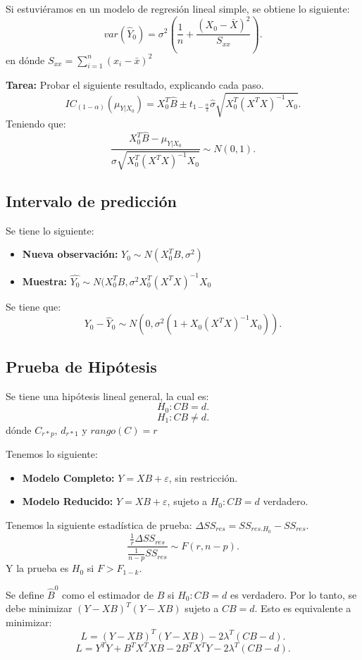 \documentclass{article}
\begin{document}
Si estuviéramos en un modelo de regresión lineal simple, se obtiene lo siguiente:
\[ var(\hat{Y}_{0})=\sigma^{2}(\frac{1}{n}+ \frac{(X_{0}-\bar{X})^{2}}{S_{xx}}) .\]
en dónde $S_{xx}=\sum_{i=1}^{n}(x_{i}-\bar{x})^{2}$

\textbf{Tarea: }Probar el siguiente resultado, explicando cada paso.
\[ IC_{(1-\alpha)}(\mu_{Y|X_{0}})=X_{0}^{T}\hat{B} \pm t_{1-\frac{\alpha}{2}}\hat{\sigma}\sqrt{X_{0}^{T}(X^{T}X)^{-1}X_{0}} .\]
Teniendo que:
\[ \frac{X_{0}^{T}\hat{B}-\mu_{Y|X_{0}}}{\sigma \sqrt{X_{0}^{T}(X^{T}X)^{-1}X_{0}}} \sim N(0,1).\]

\subsection{Intervalo de predicción}

Se tiene lo siguiente:
\begin{itemize}
	\item \textbf{Nueva observación: }$Y_{0}\sim N(X_{0}^{T}B,\sigma^{2})$
	\item \textbf{Muestra: }$\hat{Y_{0}}\sim N(X_{0}^{T}B,\sigma^{2}X_{0}^{T}(X^{T}X)^{-1}X_{0}$
\end{itemize}

Se tiene que:
\[ Y_{0}-\hat{Y}_{0} \sim N(0,\sigma^{2}(1+X_{0}(X^{T}X)^{-1}X_{0})) .\]

\subsection{Prueba de Hipótesis}
Se tiene una hipótesis lineal general, la cual es:
\[ H_{0}: CB =d .\]
\[ H_{1}: CB \neq d.\]
dónde $C_{r*p}$, $d_{r*1}$ y $rango(C)=r$

Tenemos lo siguiente:
\begin{itemize}
	\item \textbf{Modelo Completo: }$Y=XB+\varepsilon$, sin restricción.
	\item \textbf{Modelo Reducido:} $Y=XB+\varepsilon$, sujeto a $H_{0}: CB=d$ verdadero.
\end{itemize}

Tenemos la siguiente estadística de prueba: $\Delta SS_{res}=SS_{res.H_{0}}-SS_{res}$.
\[ \frac{\frac{1}{r}\Delta SS_{res}}{\frac{1}{n-p}SS_{res}} \sim F(r,n-p) .\]
Y la prueba es $H_{0}$ si $F > F_{1-k}$.

Se define $\hat{B}^{0}$ como el estimador de $B$ si $H_{0}: CB=d$ es verdadero. Por lo tanto, se debe minimizar $(Y-XB)^{T}(Y-XB)$ sujeto a $CB=d$. Esto es equivalente a minimizar:
\[ L =(Y-XB)^{T}(Y-XB)-2\lambda^{T}(CB-d) .\]
\[ L=Y^{T}Y+B^{T}X^{T}XB-2B^{T}X^{T}Y-2\lambda^{T}(CB-d) .\]
\end{document}
